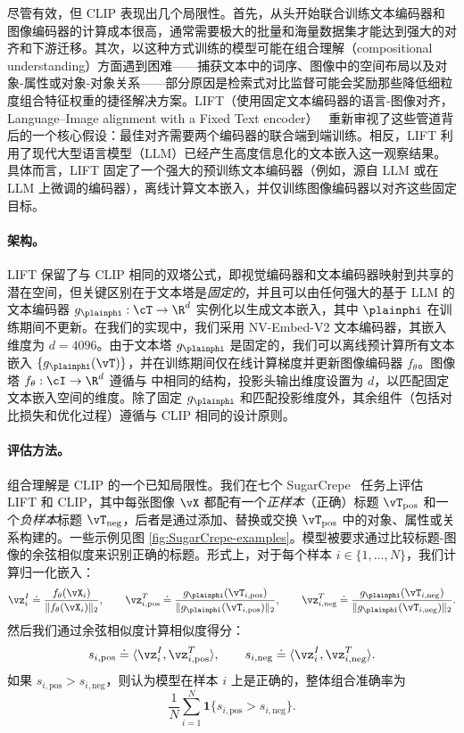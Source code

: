 \documentclass[../../book-main_zh.tex]{subfiles}
\begin{document}
尽管有效，但 CLIP 表现出几个局限性。首先，从头开始联合训练文本编码器和图像编码器的计算成本很高，通常需要极大的批量和海量数据集才能达到强大的对齐和下游迁移。其次，以这种方式训练的模型可能在组合理解（compositional understanding）方面遇到困难——捕获文本中的词序、图像中的空间布局以及对象-属性或对象-对象关系——部分原因是检索式对比监督可能会奖励那些降低细粒度组合特征权重的捷径解决方案。LIFT（使用固定文本编码器的语言-图像对齐，Language–Image alignment with a Fixed Text encoder）~\citep{yang2025languageimagealignmentfixedtext} 重新审视了这些管道背后的一个核心假设：最佳对齐需要两个编码器的联合端到端训练。相反，LIFT 利用了现代大型语言模型（LLM）已经产生高度信息化的文本嵌入这一观察结果。具体而言，LIFT 固定了一个强大的预训练文本编码器（例如，源自 LLM 或在 LLM 上微调的编码器），离线计算文本嵌入，并仅训练图像编码器以对齐这些固定目标。

\paragraph{架构。}
LIFT 保留了与 CLIP 相同的双塔公式，即视觉编码器和文本编码器映射到共享的潜在空间，但关键区别在于文本塔是\emph{固定的}，并且可以由任何强大的基于 LLM 的文本编码器 \(g_{\plainphi}:\cT\to\R^{d}\) 实例化以生成文本嵌入，其中 \(\plainphi\) 在训练期间不更新。在我们的实现中，我们采用 NV-Embed-V2 文本编码器，其嵌入维度为 \(d=4096\)。由于文本塔 \(g_{\plainphi}\) 是固定的，我们可以离线预计算所有文本嵌入 \(\{g_{\plainphi}(\vT)\}\)，并在训练期间仅在线计算梯度并更新图像编码器 \(f_{\theta}\)。图像塔 \(f_{\theta}:\cI\to\R^{d}\) 遵循与  中相同的结构，投影头输出维度设置为 \(d\)，以匹配固定文本嵌入空间的维度。除了固定 \(g_{\plainphi}\) 和匹配投影维度外，其余组件（包括对比损失和优化过程）遵循与 CLIP 相同的设计原则。

\paragraph{评估方法。} 
组合理解是 CLIP 的一个已知局限性。我们在七个 SugarCrepe~\citep{hsieh2023sugarcrepe} 任务上评估 LIFT 和 CLIP，其中每张图像 \(\vX\) 都配有一个\emph{正样本}（正确）标题 \(\vT_{\text{pos}}\) 和一个\emph{负样本}标题 \(\vT_{\text{neg}}\)，后者是通过添加、替换或交换 \(\vT_{\text{pos}}\) 中的对象、属性或关系构建的。一些示例见图 \ref{fig:SugarCrepe-examples}。模型被要求通过比较标题-图像的余弦相似度来识别正确的标题。形式上，对于每个样本 \(i\in\{1,\dots,N\}\)，我们计算归一化嵌入：
\[
\vz_i^{I} \doteq \frac{f_{\theta}(\vX_i)}{\|f_{\theta}(\vX_i)\|_2},\qquad
\vz_{i,\text{pos}}^{T} \doteq \frac{g_{\plainphi}(\vT_{i,\text{pos}})}{\|g_{\plainphi}(\vT_{i,\text{pos}})\|_2},\qquad
\vz_{i,\text{neg}}^{T} \doteq \frac{g_{\plainphi}(\vT_{i,\text{neg}})}{\|g_{\plainphi}(\vT_{i,\text{neg}})\|_2}.
\]
然后我们通过余弦相似度计算相似度得分：
\[
s_{i,\text{pos}} \doteq \langle \vz_i^{I}, \vz_{i,\text{pos}}^{T} \rangle,
\qquad
s_{i,\text{neg}} \doteq \langle \vz_i^{I}, \vz_{i,\text{neg}}^{T} \rangle.
\]
如果 \(s_{i,\text{pos}} > s_{i,\text{neg}}\)，则认为模型在样本 \(i\) 上是正确的，整体组合准确率为
\[
\frac{1}{N}\sum_{i=1}^{N}\boldsymbol{1}\{s_{i,\text{pos}} > s_{i,\text{neg}}\}.
\]
\end{document}

